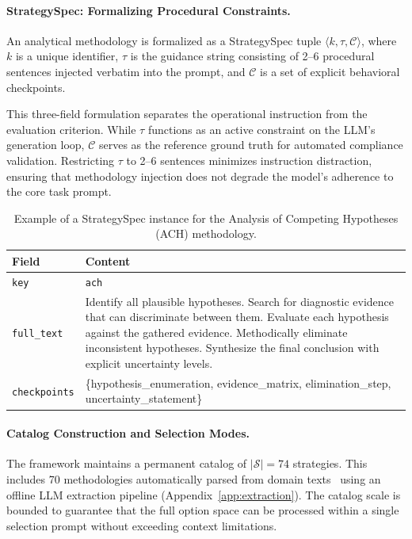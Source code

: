 \paragraph{StrategySpec: Formalizing Procedural Constraints.}
An analytical methodology is formalized as a StrategySpec tuple $\langle k, \tau, \mathcal{C} \rangle$, where $k$ is a unique identifier, $\tau$ is the guidance string consisting of 2--6 procedural sentences injected verbatim into the prompt, and $\mathcal{C}$ is a set of explicit behavioral checkpoints. 

This three-field formulation separates the operational instruction from the evaluation criterion. While $\tau$ functions as an active constraint on the LLM's generation loop, $\mathcal{C}$ serves as the reference ground truth for automated compliance validation. Restricting $\tau$ to 2--6 sentences minimizes instruction distraction, ensuring that methodology injection does not degrade the model's adherence to the core task prompt.

\begin{table}[h]
  \centering
  \small
  \caption{Example of a StrategySpec instance for the Analysis of Competing Hypotheses (ACH) methodology.}
  \label{tab:strategyspec}
  {\setlength{\tabcolsep}{3pt}\begin{tabular}{p{1.8cm}p{4.7cm}}
    \toprule
    \textbf{Field} & \textbf{Content} \\
    \midrule
    \texttt{key} & \texttt{ach} \\
    \texttt{full\_text} & Identify all plausible hypotheses. Search for diagnostic evidence that can discriminate between them. Evaluate each hypothesis against the gathered evidence. Methodically eliminate inconsistent hypotheses. Synthesize the final conclusion with explicit uncertainty levels. \\
    \texttt{checkpoints} & \{hypothesis\_enumeration, evidence\_matrix, elimination\_step, uncertainty\_statement\} \\
    \bottomrule
  \end{tabular}}
\end{table}

\paragraph{Catalog Construction and Selection Modes.}
The framework maintains a permanent catalog of $|\mathcal{S}|=74$ strategies. This includes 70 methodologies automatically parsed from domain texts~\cite{heuer2010structured, crispdm2000} using an offline LLM extraction pipeline (Appendix~\ref{app:extraction}). The catalog scale is bounded to guarantee that the full option space can be processed within a single selection prompt without exceeding context limitations.

